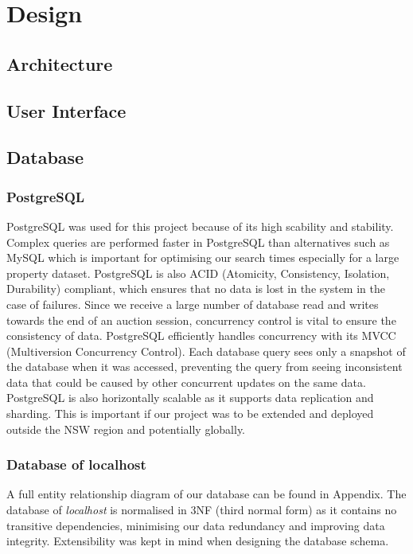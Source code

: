 \section{Design}

\subsection{Architecture}

\subsection{User Interface}

\subsection{Database}

\subsubsection{PostgreSQL}

PostgreSQL was used for this project because of its high scability and stability.
Complex queries are performed faster in PostgreSQL than alternatives such as MySQL
which is important for optimising our search times especially for a large property
dataset. PostgreSQL is also ACID (Atomicity, Consistency, Isolation, Durability)
compliant, which ensures that no data is lost in the system in the case of failures.
Since we receive a large number of database read and writes towards the end
of an auction session, concurrency control is vital to ensure the consistency
of data. PostgreSQL efficiently handles concurrency with its MVCC (Multiversion
Concurrency Control). Each database query sees only a snapshot of the database
when it was accessed, preventing the query from seeing inconsistent data that
could be caused by other concurrent updates on the same data. PostgreSQL is also
horizontally scalable as it supports data replication and sharding.
This is important if our project was to be extended and deployed outside the NSW
region and potentially globally.

\subsubsection{Database of localhost}

A full entity relationship diagram of our database can be found in Appendix.
The database of \emph{localhost} is normalised in 3NF (third normal form) as it
contains no transitive dependencies, minimising our data redundancy and
improving data integrity. Extensibility was kept in mind when designing the
database schema.


